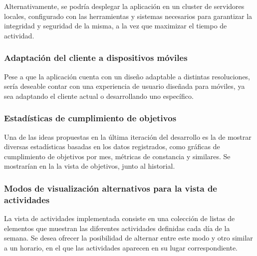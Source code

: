 \documentclass[10pt, a4paper]{aqademic}
\begin{document}
Alternativamente, se podría desplegar la aplicación en un cluster de servidores locales, configurado con las herramientas y sistemas necesarios para garantizar la integridad y seguridad de la misma, a la vez que maximizar el tiempo de actividad.


\subsubsection*{Adaptación del cliente a dispositivos móviles}

Pese a que la aplicación cuenta con un diseño adaptable a distintas resoluciones, sería deseable contar con una experiencia de usuario diseñada para móviles, ya sea adaptando el cliente actual o desarrollando uno específico.


\subsubsection*{Estadísticas de cumplimiento de objetivos}

Una de las ideas propuestas en la última iteración del desarrollo es la de mostrar diversas estadísticas basadas en los datos registrados, como gráficas de cumplimiento de objetivos por mes, métricas de constancia y similares. Se mostrarían en la la vista de objetivos, junto al historial.


\subsubsection*{Modos de visualización alternativos para la vista de actividades}

La vista de actividades implementada consiste en una colección de listas de elementos que muestran las diferentes actividades definidas cada día de la semana. Se desea ofrecer la posibilidad de alternar entre este modo y otro similar a un horario, en el que las actividades aparecen en su lugar correspondiente.


\newpage



\end{document}
